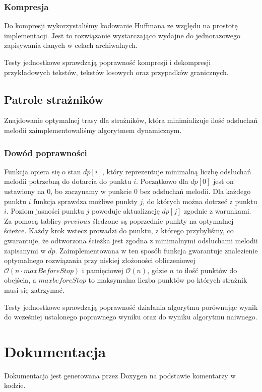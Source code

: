 \documentclass{article}
\begin{document}
\subsubsection{Kompresja}
Do kompresji wykorzystaliśmy kodowanie Huffmana ze względu na prostotę implementacji.
Jest to rozwiązanie wystarczająco wydajne
do jednorazowego zapisywania danych w celach archiwalnych.

\noindent Testy jednostkowe sprawdzają poprawność kompresji i dekompresji
przykładowych tekstów, tekstów losowych oraz przypadków granicznych.

\subsection{Patrole strażników}
Znajdowanie optymalnej trasy dla strażników, która minimializuje ilość odsłuchań melodii
zaimplementowaliśmy algorytmem dynamicznym.
\subsubsection{Dowód poprawności}
Funkcja opiera się o stan \(dp[i]\), który reprezentuje minimalną liczbę odsłuchań
melodii potrzebną do dotarcia do punktu \(i\). Początkowo dla \(dp[0]\) jest on ustawiony na 0,
bo zaczynamy w punkcie 0 bez odsłuchań melodii.
Dla każdego punktu \(i\) funkcja sprawdza możliwe punkty \(j\), do których można dotrzeć z punktu \(i\).
Poziom jasności punktu \(j\) powoduje aktualizację \(dp[j]\) zgodnie z warunkami. Za pomocą tablicy \(previous\)
śledzone są poprzednie punkty na optymalnej ścieżce. Każdy krok wstecz prowadzi do punktu, z którego
przybyliśmy, co gwarantuje, że odtworzona ścieżka jest zgodna z minimalnymi odsłuchami melodii
zapisanymi w \(dp\). Zaimplementowana w ten sposób funkcja gwarantuje znalezienie optymalnego rozwiązania
przy niskiej złożoności obliczeniowej \(\mathcal{O}(n \cdot maxBeforeStop)\) i pamięciowej \(\mathcal{O}(n)\),
gdzie \(n\) to ilość punktów do obejścia, a \(maxbeforeStop\) to
maksymalna liczba punktów po których strażnik musi się zatrzymać.

\noindent Testy jednostkowe sprawdzają poprawność działania algorytmu porównując wynik
do wcześniej ustalonego poprawnego wyniku oraz do wyniku algorytmu naiwnego.
\section{Dokumentacja}
Dokumentacja jest generowana przez Doxygen na podstawie komentarzy w kodzie.

\printbibliography[heading=bibnumbered]
\end{document}
